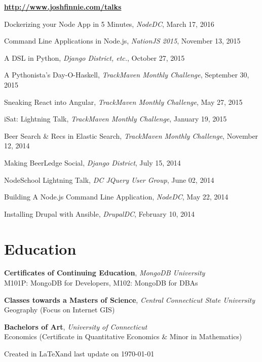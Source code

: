 \documentclass[margin,line,10pt]{resume}
\begin{document}
\begin{resume}
\textbf{\href{http://www.joshfinnie.com/talks}{http://www.joshfinnie.com/talks}}\vspace{1mm}
\begin{list2}
    \item Dockerizing your Node App in 5 Minutes, \textsl{NodeDC}, March 17, 2016
    \item Command Line Applications in Node.js, \textsl{NationJS 2015}, November 13, 2015
    \item A DSL in Python, \textsl{Django District, etc.}, October 27, 2015
    \item A Pythonista's Day-O-Haskell, \textsl{TrackMaven Monthly Challenge}, September 30, 2015
    \item Sneaking React into Angular, \textsl{TrackMaven Monthly Challenge}, May 27, 2015
    \item iSat: Lightning Talk, \textsl{TrackMaven Monthly Challenge}, January 19, 2015
    \item Beer Search \& Recs in Elastic Search, \textsl{TrackMaven Monthly Challenge}, November 12, 2014
    \item Making BeerLedge Social, \textsl{Django District}, July 15, 2014
    \item NodeSchool Lightning Talk, \textsl{DC JQuery User Group}, June 02, 2014
    \item Building A Node.js Command Line Application, \textsl{NodeDC}, May 22, 2014
    \item Installing Drupal with Ansible, \textsl{DrupalDC}, February 10, 2014
\end{list2}

\section{\mysidestyle Education\\\vspace{5pt}}

\textbf{Certificates of Continuing Education}, \textsl{MongoDB University}\\
M101P: MongoDB for Developers, M102: MongoDB for DBAs\vspace{-3mm}

\textbf{Classes towards a Masters of Science}, \textsl{Central Connecticut State University}\\
Geography (Focus on Internet GIS)\vspace{-3mm}

\textbf{Bachelors of Art}, \textsl{University of Connecticut}\\
Economics (Certificate in Quantitative Economics \& Minor in Mathematics)\vspace{20mm}

\hfill Created in \LaTeX and last update on \today
\end{resume}
\end{document}
